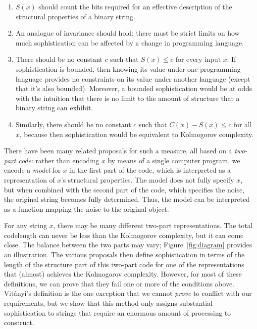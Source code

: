 \documentclass{style/llncs}
\begin{document}
\begin{enumerate}
\item $S(x)$ should count the bits required for an effective description of the structural properties of a binary string.
\item An analogue of invariance should hold: there must be strict limits on how much sophistication can be affected by a change in programming language.
\item There should be no constant $c$ such that $S(x)\le c$ for every input $x$. If sophistication is bounded, then knowing its value under one programming language provides no constraints on its value under another language (except that it's also bounded). Moreover, a bounded sophistication would be at odds with the intuition that there is no limit to the amount of structure that a binary string can exhibit.
\item Similarly, there should be no constant $c$ such that $C(x)-S(x)\le c$ for all $x$, because then sophistication would be equivalent to Kolmogorov complexity. 
\end{enumerate}
There have been many related proposals for such a measure, all based on a \emph{two-part code}: rather than encoding $x$ by means of a single computer program, we encode a \emph{model} for $x$ in the first part of the code, which is interpreted as a representation of $x$'s structural properties. The model does not fully specify $x$, but when combined with the second part of the code, which specifies the noise, the original string becomes fully determined. Thus, the model can be interpreted as a function mapping the noise to the original object.

For any string $x$, there may be many different two-part representations. The total codelength can never be less than the Kolmogorov complexity, but it can come close. The balance between the two parts may vary; Figure~\ref{fig:diagram} provides an illustration. The various proposals then define sophistication in terms of the length of the structure part of this two-part code for one of the representations that (almost) achieves the Kolmogorov complexity. However, for most of these definitions, we can prove that they fail one or more of the conditions above. Vit\'anyi's definition \cite{vitanyi2004meaningful} is the one exception that we cannot \emph{prove} to conflict with our requirements, but we show that this method only assigns substantial sophistication to strings that require an enormous amount of processing to construct.
\end{document}
